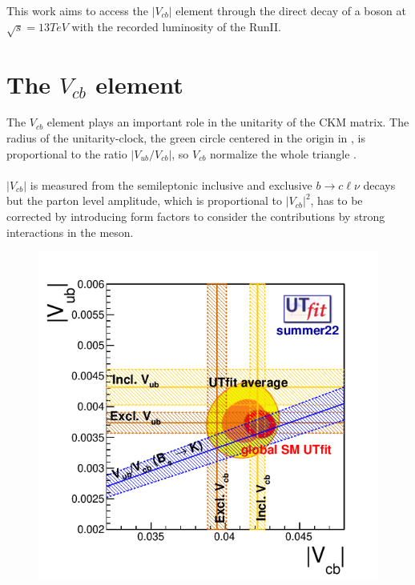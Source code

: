 \label{sec:vcb}
\vspace{-1cm}
\minitoc
This work aims to access the $|V_{cb}|$ element through the direct decay of a \PW boson at $\sqrt{s}=13 TeV$ with the recorded luminosity of the RunII.
\vspace{-0.25cm}
\section{The $V_{cb}$ element}\label{sec:vcb}
\begin{minipage}{\linewidth}
    \begin{minipage}{0.43\linewidth}
    \vspace{-0.3cm}
        The $V_{cb}$ element plays an important role in the unitarity of the CKM matrix. The radius of the unitarity-clock, the green circle centered in the origin in , is proportional to the ratio $|V_{ub}/V_{cb}|$, so $V_{cb}$ normalize the whole triangle \cite{Ricciardi2019DeterminationV_cb}.\\
        \\
        $|V_{cb}|$ is measured from the semileptonic inclusive and exclusive $b \to c\ell\nu$
        decays but the parton level amplitude, which is proportional to $|V_{cb}|^2$, has to be corrected by introducing form factors to consider the contributions by strong interactions in the meson. 
    \end{minipage}
    \hfill
    \begin{minipage}{0.55\linewidth}
        \vspace{-2.175cm}
        \begin{figure}[H]
            \centering
            \includegraphics[width=\linewidth]{fig//chap02-theory/vubvcb.png}

\end{figure}
\end{minipage}
\end{minipage}
